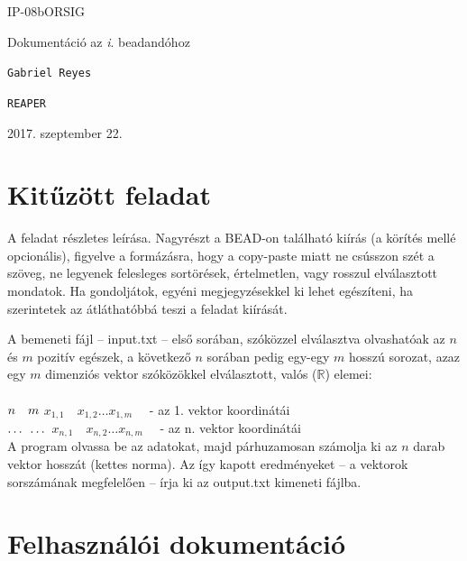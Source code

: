 \documentclass[12pt]{article}
\begin{document}
\begin{titlepage}
	\vspace*{0.5cm}
	{\normalsize IP-08bORSIG}
	
	\vspace{2cm}
	{\huge Dokumentáció az \textit{i}. beadandóhoz}
	
	\vspace*{5cm}
	
	{\large \verb|Gabriel Reyes| } %
	
	{\large \verb|REAPER| }  %
		
	
	\vfill
	
	\vspace*{1cm}
	2017. szeptember 22. %
\end{titlepage}

\section{Kitűzött feladat}
\begin{itshape}
	A feladat részletes leírása. Nagyrészt a BEAD-on található kiírás (a körítés mellé opcionális), figyelve a formázásra, hogy a copy-paste miatt ne csússzon szét a szöveg, ne legyenek felesleges sortörések, értelmetlen, vagy rosszul elválasztott mondatok. Ha gondoljátok, egyéni megjegyzésekkel ki lehet egészíteni, ha szerintetek az átláthatóbbá teszi a feladat kiírását.\\
\end{itshape}

A bemeneti fájl -- input.txt -- első sorában, szóközzel elválasztva olvashatóak az $n$ és $m$ pozitív egészek, a következő $n$ sorában pedig egy-egy $m$ hosszú sorozat, azaz egy $m$ dimenziós vektor szóközökkel elválasztott, valós ($\mathbb{R}$) elemei:\\
\\
$n \quad m\\ $
$x_{1,1} \quad x_{1,2} \dots x_{1,m} \quad $ - az 1. vektor koordinátái\\
$\dots\\ $
$\dots\\ $
$x_{n,1} \quad x_{n,2} \dots x_{n,m} \quad $ - az n. vektor koordinátái\\

A program olvassa be az adatokat, majd párhuzamosan számolja ki az $n$ darab vektor hosszát (kettes norma).
Az így kapott eredményeket -- a vektorok sorszámának megfelelően -- írja ki az output.txt kimeneti fájlba.

\section{Felhasználói dokumentáció}
\end{document}
